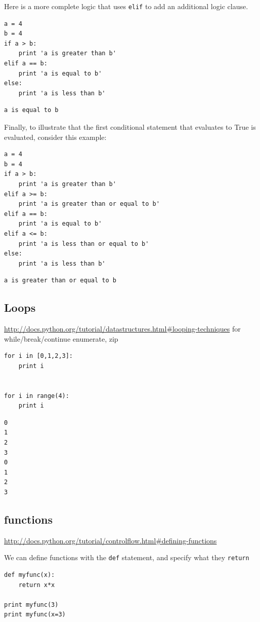 \documentclass[11pt]{article}
\begin{document}
Here is a more complete logic that uses \texttt{elif} to add an additional logic clause.
\begin{verbatim}
a = 4
b = 4
if a > b:
    print 'a is greater than b'
elif a == b:
    print 'a is equal to b'
else:
    print 'a is less than b'
\end{verbatim}

\begin{verbatim}
a is equal to b
\end{verbatim}

Finally, to illustrate that the first conditional statement that evaluates to True is evaluated, consider this example:
\begin{verbatim}
a = 4
b = 4
if a > b:
    print 'a is greater than b'
elif a >= b:
    print 'a is greater than or equal to b'
elif a == b:
    print 'a is equal to b'
elif a <= b:
    print 'a is less than or equal to b'
else:
    print 'a is less than b'
\end{verbatim}

\begin{verbatim}
a is greater than or equal to b
\end{verbatim}


\subsection{Loops}
\label{sec:org401a87d}
\url{http://docs.python.org/tutorial/datastructures.html\#looping-techniques}
for
while/break/continue
enumerate, zip

\begin{verbatim}
for i in [0,1,2,3]:
    print i


for i in range(4):
    print i
\end{verbatim}

\begin{verbatim}
0
1
2
3
0
1
2
3
\end{verbatim}


\subsection{functions}
\label{sec:org5c1377d}
\url{http://docs.python.org/tutorial/controlflow.html\#defining-functions}

We can define functions with the \texttt{def} statement, and specify what they \texttt{return}
\begin{verbatim}
def myfunc(x):
    return x*x

print myfunc(3)
print myfunc(x=3)
\end{verbatim}
\end{document}
